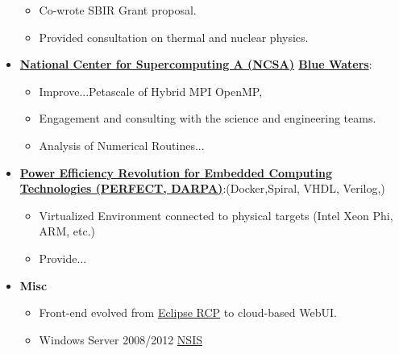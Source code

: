 \documentclass{article}
\begin{document}
\begin{itemize}
  \begin{itemize}[leftmargin=*]
    \item Co-wrote SBIR Grant proposal. 
    \item Provided consultation on thermal and nuclear physics.
  \end{itemize}

\item \textbf{\href{http://www.ncsa.illinois.edu}{National Center for Supercomputing A (NCSA)} \href{http://www.ncsa.illinois.edu/enabling/bluewaters}{Blue Waters}}:

  \begin{itemize}[leftmargin=*]
    \item Improve...Petascale of Hybrid MPI OpenMP,  
    \item Engagement and consulting with the science and engineering teams.
    \item Analysis of Numerical Routines...
  \end{itemize}
  
\item \textbf{\href{http://www.darpa.mil/Our_Work/MTO/Programs/Power_Efficiency_Revolution_for_Embedded_Computing_Technologies_(PERFECT).aspx}{Power Efficiency Revolution for Embedded Computing Technologies (PERFECT, \href{http://www.darpa.mil/default.aspx}{DARPA})}}:(Docker,Spiral, VHDL, Verilog,)

  \begin{itemize}[leftmargin=*]
    \item Virtualized Environment connected to physical targets (Intel Xeon Phi, ARM, etc.)
    \item Provide...
  \end{itemize}

\item \textbf{Misc}
  \begin{itemize}[leftmargin=*]
    \item Front-end evolved from \href{https://wiki.eclipse.org/index.php/Rich_Client_Platform}{Eclipse RCP} to cloud-based WebUI. 
    \item Windows Server 2008/2012 \href{http://nsis.sourceforge.net/Main_Page}{NSIS}
  \end{itemize}

\end{itemize}
\end{document}
